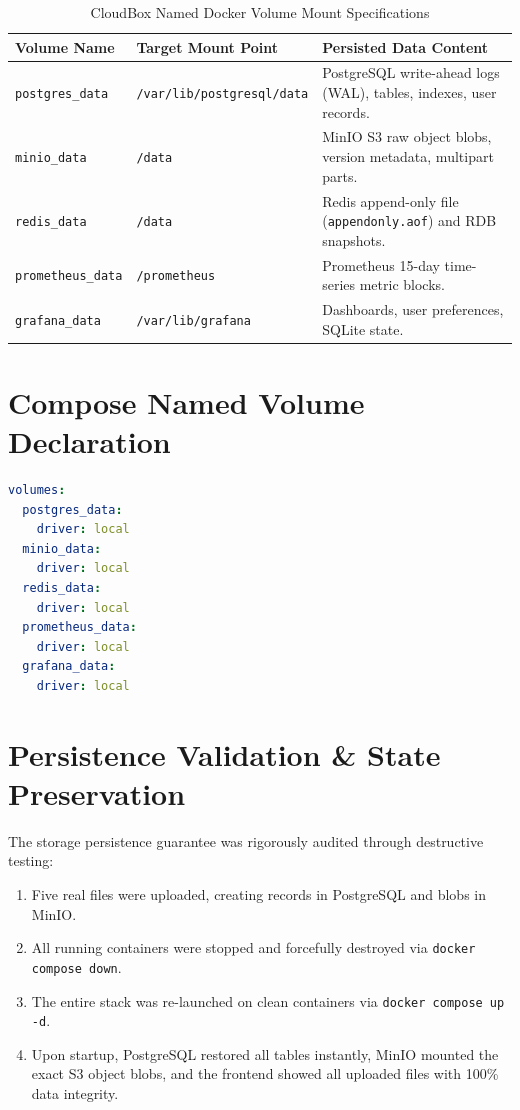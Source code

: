 \documentclass[11pt,a4paper]{report}
\begin{document}
\begin{table}[h!]
\centering
\small
\begin{tabularx}{\textwidth}{llX}
\toprule
\textbf{Volume Name} & \textbf{Target Mount Point} & \textbf{Persisted Data Content} \\
\midrule
\texttt{postgres\_data} & \texttt{/var/lib/postgresql/data} & PostgreSQL write-ahead logs (WAL), tables, indexes, user records. \\
\texttt{minio\_data} & \texttt{/data} & MinIO S3 raw object blobs, version metadata, multipart parts. \\
\texttt{redis\_data} & \texttt{/data} & Redis append-only file (\texttt{appendonly.aof}) and RDB snapshots. \\
\texttt{prometheus\_data} & \texttt{/prometheus} & Prometheus 15-day time-series metric blocks. \\
\texttt{grafana\_data} & \texttt{/var/lib/grafana} & Dashboards, user preferences, SQLite state. \\
\bottomrule
\end{tabularx}
\caption{CloudBox Named Docker Volume Mount Specifications}
\end{table}

\section{Compose Named Volume Declaration}
\begin{lstlisting}[language=yaml]
volumes:
  postgres_data:
    driver: local
  minio_data:
    driver: local
  redis_data:
    driver: local
  prometheus_data:
    driver: local
  grafana_data:
    driver: local
\end{lstlisting}

\section{Persistence Validation \& State Preservation}
The storage persistence guarantee was rigorously audited through destructive testing:
\begin{enumerate}[itemsep=1pt,topsep=1pt]
    \item Five real files were uploaded, creating records in PostgreSQL and blobs in MinIO.
    \item All running containers were stopped and forcefully destroyed via \texttt{docker compose down}.
    \item The entire stack was re-launched on clean containers via \texttt{docker compose up -d}.
    \item Upon startup, PostgreSQL restored all tables instantly, MinIO mounted the exact S3 object blobs, and the frontend showed all uploaded files with 100\% data integrity.
\end{enumerate}
\end{document}
